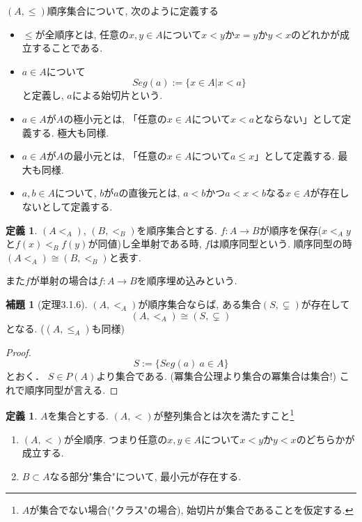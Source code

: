 \documentclass[dvipdfmx,a4paper,11pt]{report}
\theoremstyle{definition}
\newtheorem{lem}[thm]{補題}
\newtheorem{dfn}[thm]{定義}
\begin{document}
 
 \begin{tcolorbox}
 [colback = white, colframe = green!35!black, fonttitle = \bfseries,breakable = true]
$(A,\le)$順序集合について, 次のように定義する
\begin{itemize}
\item $\le$が全順序とは, 任意の$x, y \in A$について$x <y$か$x=y$か$y < x$のどれかが成立することである. 
\item $a \in A$について
$$
Seg(a) := \{ x \in A | x < a\}
$$
と定義し, $a$による始切片という.
\item $a \in A$が$A$の極小元とは, 「任意の$x\in A$について$x<a$とならない」として定義する. 極大も同様.
\item $a \in A$が$A$の最小元とは, 「任意の$x\in A$について$a\le x$」として定義する. 最大も同様.
\item $a, b\in A$について, $b$が$a$の直後元とは, $a < b$かつ$a < x < b$なる$x \in A$が存在しないとして定義する. 
\end{itemize}
\end{tcolorbox}


 \begin{tcolorbox}[colback = white, colframe = green!35!black, fonttitle = \bfseries,breakable = true]
 \begin{dfn}
 $(A <_A)$, $(B, <_B)$を順序集合とする.
 $f : A \to B$が順序を保存($x <_A y$と$f(x) <_B f(y)$が同値)し全単射である時, $f$は順序同型という. 順序同型の時 $(A <_A) \cong (B, <_B)$と表す. 
 
 また$f$が単射の場合は$f : A \to B$を順序埋め込みという. 
 \end{dfn}
 \end{tcolorbox}
 
  \begin{tcolorbox}
 [colback = white, colframe = green!35!black, fonttitle = \bfseries,breakable = true]
 \begin{lem}[定理3.1.6]
 $(A,<_A)$が順序集合ならば, ある集合$(S, \subsetneq)$が存在して
 $$
 (A,<_A) \cong (S, \subsetneq)
 $$
 となる. ($(A, \le_A)$も同様)
 \end{lem}
 \end{tcolorbox}
 \begin{proof}
 $$
 S := \{ Seg(a) \ a \in A\}
 $$
 とおく． $S \in P(A)$より集合である. (冪集合公理より集合の冪集合は集合!)
 これで順序同型が言える. 
 \end{proof}

 \begin{tcolorbox}
 [colback = white, colframe = green!35!black, fonttitle = \bfseries,breakable = true]
 \begin{dfn}
 $A$を集合とする. 
 $(A,<)$が整列集合とは次を満たすこと\footnote{$A$が集合でない場合("クラス"の場合), 始切片が集合であることを仮定する.}
 \begin{enumerate}
 \item  $(A,<)$が全順序. つまり任意の$x, y \in A$について$x <y$か$y < x$のどちらかが成立する.
 \item $B \subset A$なる部分"集合"について, 最小元が存在する. 
 \end{enumerate}
\end{dfn}
\end{tcolorbox}
\end{document}
